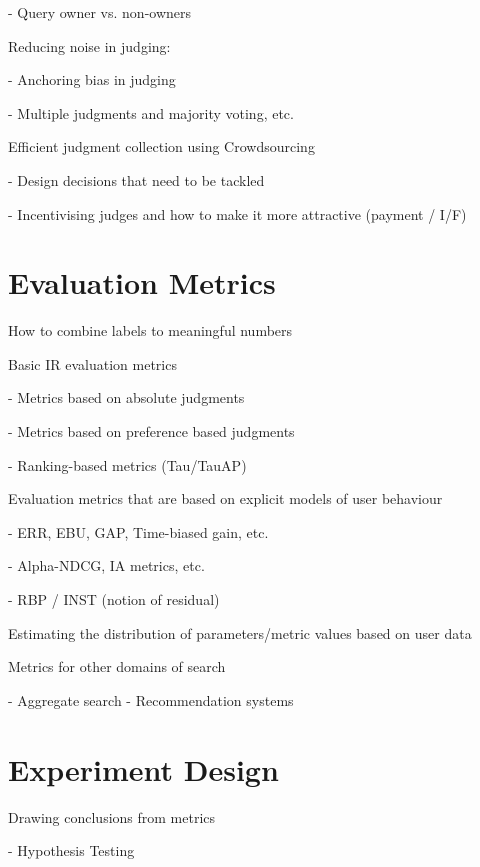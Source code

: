 \documentclass[openany]{now} %
\newcommand{\newpar}{\bigskip\noindent}
\begin{document}
- Query owner vs. non-owners \cite{Chouldechova:2013}

\newpar
Reducing noise in judging: 

- Anchoring bias in judging \cite{Shokouhi:2015}

- Multiple judgments and majority voting, etc. \cite{Venanzi:2014}

\newpar
Efficient judgment collection using Crowdsourcing

-	Design decisions that need to be tackled  \cite{Blanco:2011} \cite{Kazai2012} \cite{Alonso2012} \cite{Alonso:2015} \cite{Scholer:2013} 

-	Incentivising judges and how to make it more attractive (payment / I/F)
\cite{Megorskaya2015} \cite{Davtyan2015}  \cite{Rokicki:2014}  \cite{Eickhoff:2012}

\chapter{Evaluation Metrics}
\label{c-metrics}

How to combine labels to meaningful numbers

Basic IR evaluation metrics

- Metrics based on absolute judgments

- Metrics based on preference based judgments	

- Ranking-based metrics (Tau/TauAP)

\newpar
Evaluation metrics that are based on explicit models of user behaviour

-	ERR, EBU, GAP, Time-biased gain, etc.

-	Alpha-NDCG, IA metrics, etc.

-	RBP / INST (notion of residual)

\newpar
Estimating the distribution of parameters/metric values based on user data

\cite{CarteretteKY11}

\newpar
Metrics for other domains of search

- Aggregate search \cite{Zhou:2013}
- Recommendation systems \cite{gunawardana2015evaluating}

\chapter{Experiment Design}
\label{c-experiment-design}

Drawing conclusions from metrics

- Hypothesis Testing \cite{Dincer:2014}
\end{document}

